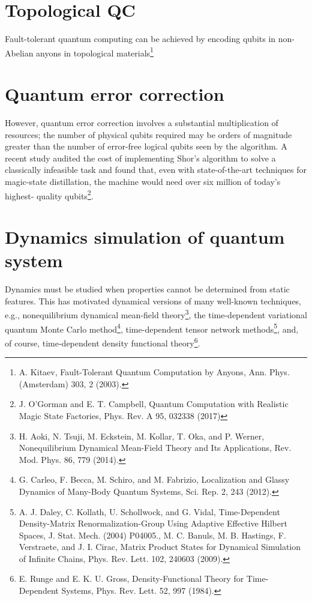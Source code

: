 \documentclass[11pt, oneside]{article}   	%
\begin{document}
\appendix
\section{Topological QC}
Fault-tolerant quantum computing can be achieved by encoding qubits in non-Abelian anyons in topological materials\footnote{A. Kitaev, Fault-Tolerant Quantum Computation by Anyons, Ann. Phys. (Amsterdam) 303, 2 (2003).}

\section{Quantum error correction}
However, quantum error correction involves a substantial multiplication of resources; the number of physical qubits required may be orders of magnitude greater than the number of error-free logical qubits seen by the algorithm. A recent study audited the cost of implementing Shor’s algorithm to solve a classically infeasible task and found that, even with state-of-the-art techniques for magic-state distillation, the machine would need over six million of today’s highest- quality qubits\footnote{J. O’Gorman and E. T. Campbell, Quantum Computation with Realistic Magic State Factories, Phys. Rev. A 95, 032338 (2017)}.

\section{Dynamics simulation of  quantum system}
Dynamics must be studied when properties cannot be determined from static features. 
This has motivated dynamical versions of many well-known techniques, e.g., nonequilibrium dynamical mean-field theory\footnote{H. Aoki, N. Tsuji, M. Eckstein, M. Kollar, T. Oka, and P. Werner, Nonequilibrium Dynamical Mean-Field Theory and Its Applications, Rev. Mod. Phys. 86, 779 (2014).}, 
the time-dependent variational quantum Monte Carlo method\footnote{G. Carleo, F. Becca, M. Schiro, and M. Fabrizio, Localization and Glassy Dynamics of Many-Body Quantum Systems, Sci. Rep. 2, 243 (2012).}, 
time-dependent tensor network methods\footnote{A. J. Daley, C. Kollath, U. Schollwock, and G. Vidal,
Time-Dependent Density-Matrix Renormalization-Group Using Adaptive Effective Hilbert Spaces, J. Stat. Mech. (2004) P04005., M. C. Banuls, M. B. Hastings, F. Verstraete, and J. I. Cirac, Matrix Product States for Dynamical Simulation of Infinite Chains, Phys. Rev. Lett. 102, 240603 (2009).}, 
and, of course, time-dependent density functional theory\footnote{E. Runge and E. K. U. Gross, Density-Functional Theory for
Time-Dependent Systems, Phys. Rev. Lett. 52, 997 (1984).}. 
\end{document}
